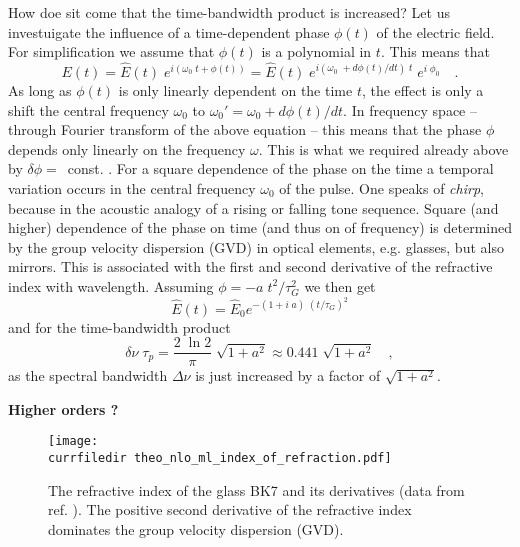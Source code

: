 How doe sit come that the time-bandwidth product is increased? 
Let us investuigate the  influence of a time-dependent phase $\phi(t)$
of the electric field. For simplification we 
assume that $\phi(t)$ is a polynomial in $t$. This means that
\begin{equation}
  E(t) = \hat{E}(t) \; e^{i ( \omega_0 \; t + \phi(t))}
  = \hat{E}(t) \; e^{i ( \omega_0 \; + d\phi(t)/dt) \; t} \; e^{i
  \; \phi_0}  \quad . \label{gl_theo_nlo_ml_field_with_phase}
\end{equation}
As long as $\phi(t)$ is only linearly dependent on the time $t$, the effect is
 only a shift the central frequency $\omega_0$ to
$\omega_0' = \omega_0 + d\phi(t)/dt$.  In frequency space -- through
Fourier transform of the above equation --  this means that the
phase $\phi$ depends only linearly on the frequency $\omega$. This
is what we required already above by  
$\delta \phi =$~const. . For a square
dependence of the phase on the time a temporal variation occurs
in the central frequency $\omega_0$ of the pulse. One  speaks
of \emph{chirp}, because in the acoustic analogy of a
rising or falling tone sequence. Square
(and higher) dependence of the phase on time (and thus on
of frequency) is determined by the group velocity dispersion
(GVD) in optical elements,
e.g. glasses, but also mirrors. This is associated with the
first and second derivative of the refractive index with 
wavelength. Assuming $\phi = - a \;
t^2 / \tau_G^2$ we then get
\begin{equation}
  \hat{E}(t) = \hat{E}_0 e^{- (1 + i \; a) \; ( t / \tau_G ) ^2}
\end{equation}
and for the time-bandwidth product
\begin{equation}
  \delta \nu \; \tau_p = \frac{2 \; \ln 2}{\pi} \; \sqrt{1 + a^2} \approx
  0.441 \; \sqrt{1 + a^2} \quad ,
\end{equation}
as the spectral bandwidth $\Delta \nu$ is just increased by a factor of
$\sqrt{1 + a^2}$. 

\textbf{Higher orders ? }

\begin{figure}
\center
\texttt{[image: \\currfiledir theo\_nlo\_ml\_index\_of\_refraction.pdf]}
\caption{The refractive index of the glass BK7 and its derivatives
(data from ref. \cite{DielsRudolph1996}). The
positive second derivative of the refractive index dominates the
group velocity dispersion (GVD). }
\label{fig_pulses_ior_gvd}
\end{figure}



